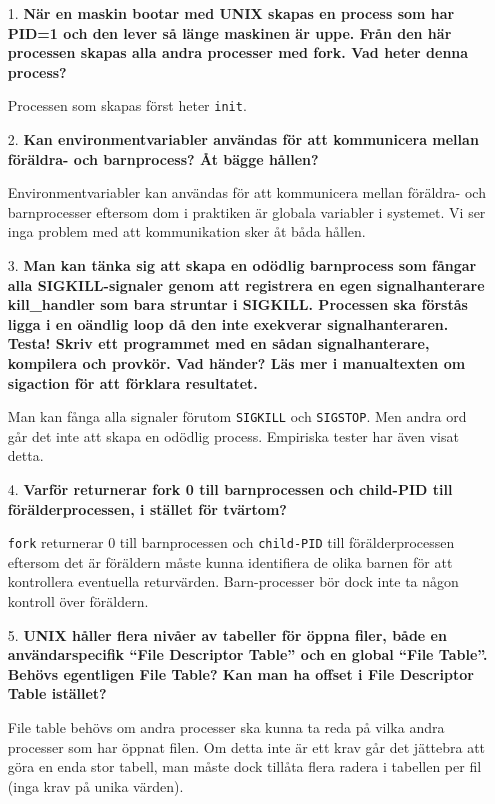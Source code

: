 \documentclass[a4paper,10pt,titlepage]{article}
\begin{document}
\begin{enumerate}
	\item[1.] \textbf{\footnotesize När en maskin bootar med UNIX skapas en process som har PID=1 och den lever så länge maskinen är uppe. Från den här processen skapas alla andra processer med fork. Vad heter denna process?}
	
	Processen som skapas först heter \verb!init!.

	\item[2.] \textbf{\footnotesize Kan environmentvariabler användas för att kommunicera mellan föräldra- och barnprocess? Åt bägge hållen?}

	Environmentvariabler kan användas för att kommunicera mellan föräldra- och barnprocesser eftersom dom i praktiken är globala variabler i systemet. Vi ser inga problem med att kommunikation sker åt båda hållen.

	\item[3.] \textbf{\footnotesize Man kan tänka sig att skapa en odödlig
        barnprocess som fångar alla SIGKILL-signaler genom att registrera en egen signalhanterare kill\_handler som bara struntar i SIGKILL. Processen ska förstås ligga i en oändlig loop då den inte exekverar signalhanteraren. Testa! Skriv ett programmet med en sådan signalhanterare, kompilera och provkör. Vad händer? Läs mer i manualtexten om sigaction för att förklara resultatet.}

	Man kan fånga alla signaler förutom \verb!SIGKILL! och \verb!SIGSTOP!. Men andra ord går det inte att skapa en odödlig process. Empiriska tester har även visat detta.

	\item[4.] \textbf{\footnotesize Varför returnerar fork 0 till barnprocessen och child-PID till förälderprocessen, i stället för tvärtom?}

	\verb!fork! returnerar 0 till barnprocessen och \verb!child-PID! till
    förälderprocessen eftersom det är föräldern måste kunna identifiera de olika barnen för att kontrollera eventuella returvärden. Barn-processer bör dock inte ta någon kontroll över föräldern.

	\item[5.] \textbf{\footnotesize UNIX håller flera nivåer av tabeller för öppna filer, både en användarspecifik ``File Descriptor Table'' och en global ``File Table''. Behövs egentligen File Table? Kan man ha offset i File Descriptor Table istället?}

	File table behövs om andra processer ska kunna ta reda på vilka andra processer som har öppnat filen. Om detta inte är ett krav går det jättebra att göra en enda stor tabell, man måste dock tillåta flera radera i tabellen per fil (inga krav på unika värden).


\end{enumerate}
\end{document}

